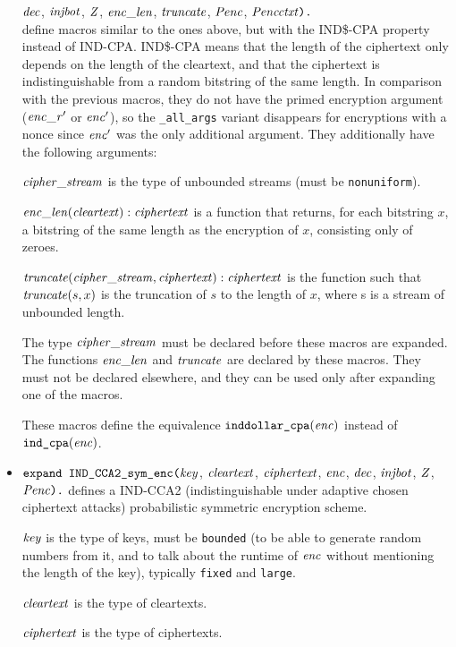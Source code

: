 \documentclass{article}
\begin{document}
\begin{itemize}
$  \mathit{dec}$, $\mathit{injbot}$, $\mathit{Z}$, $\mathit{enc\_len}$, $\mathit{truncate}$, $\mathit{Penc}$, $\mathit{Pencctxt}\texttt{).}$\\
define macros similar to the ones above, but with the IND\$-CPA property instead of IND-CPA.
IND\$-CPA means that the length of the ciphertext only depends on the length of the cleartext,
and that the ciphertext is indistinguishable from a random bitstring of the same length.
In comparison with the previous macros, they do not have the primed encryption argument ($\mathit{enc\_r}'$ or $\mathit{enc}'$), so the \texttt{\_all\_args} variant disappears for encryptions with a nonce since $\mathit{enc}'$ was the only additional argument. They additionally have the following arguments:

$\mathit{cipher\_stream}$ is the type of unbounded streams (must be \texttt{nonuniform}).

   $\mathit{enc\_len}(\mathit{cleartext}): \mathit{ciphertext}$ is a function that returns, for each bitstring $x$, a bitstring of the same length as the encryption of $x$, consisting only of zeroes.

   $\mathit{truncate}(\mathit{cipher\_stream}, \mathit{ciphertext}): \mathit{ciphertext}$ is the function such that $\mathit{truncate}(s,x)$ is the truncation of $s$ to the length of $x$, where s is a stream of unbounded length.

The type $\mathit{cipher\_stream}$ must be declared before these macros are
  expanded. The functions $\mathit{enc\_len}$ and $\mathit{truncate}$ are
  declared by these macros. They must not be declared elsewhere, and
  they can be used only after expanding one of the macros.

These macros define the equivalence $\texttt{inddollar\_cpa}(\mathit{enc})$
instead of $\texttt{ind\_cpa}(\mathit{enc})$.

\item $\texttt{expand IND\_CCA2\_sym\_enc(}\mathit{key}$,
$  \mathit{cleartext}$, $\mathit{ciphertext}$, $\mathit{enc}$,
$  \mathit{dec}$, $\mathit{injbot}$, $\mathit{Z}$, $\mathit{Penc}\texttt{).}$ defines a
  IND-CCA2 (indistinguishable under adaptive chosen ciphertext attacks)
  probabilistic symmetric encryption scheme.

   $\mathit{key}$ is the type of keys, must be \texttt{bounded} (to be able to generate random numbers from it, and to talk about the runtime of $\mathit{enc}$ without mentioning the length of the key), typically \texttt{fixed} and \texttt{large}.

   $\mathit{cleartext}$ is the type of cleartexts.

   $\mathit{ciphertext}$ is the type of ciphertexts.


\end{itemize}
\end{document}
